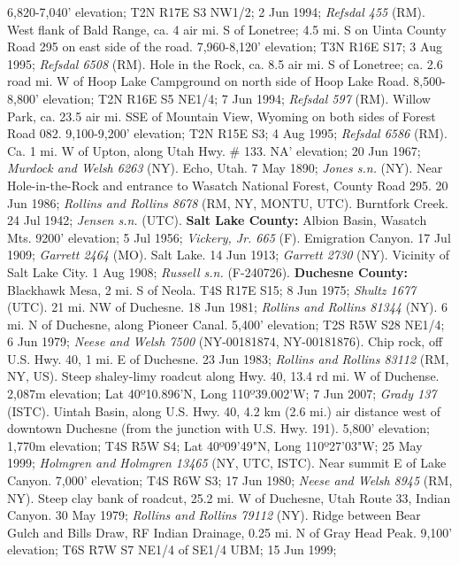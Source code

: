 6,820-7,040' elevation; T2N R17E S3 NW1/2; 2 Jun 1994; \textit{Refsdal 455} (RM).
West flank of Bald Range, ca. 4 air mi. S of Lonetree; 4.5 mi. S on Uinta County
Road 295 on east side of the road. 7,960-8,120' elevation; T3N R16E S17;
3 Aug 1995; \textit{Refsdal 6508} (RM).
Hole in the Rock, ca. 8.5 air mi. S of Lonetree; ca. 2.6 road mi. W of Hoop Lake
Campground on north side of Hoop Lake Road. 8,500-8,800' elevation;
T2N R16E S5 NE1/4; 7 Jun 1994; \textit{Refsdal 597} (RM).
Willow Park, ca. 23.5 air mi. SSE of Mountain View, Wyoming on both sides of
Forest Road 082. 9,100-9,200' elevation; T2N R15E S3; 4 Aug 1995;
\textit{Refsdal 6586} (RM).
Ca. 1 mi. W of Upton, along Utah Hwy. \# 133. NA' elevation; 20 Jun 1967;
\textit{Murdock and Welsh 6263} (NY).
Echo, Utah. 7 May 1890; \textit{Jones s.n.} (NY).
Near Hole-in-the-Rock and entrance to Wasatch National Forest, County Road 295.
20 Jun 1986; \textit{Rollins and Rollins 8678} (RM, NY, MONTU, UTC).
Burntfork Creek. 24 Jul 1942; \textit{Jensen s.n.} (UTC).
  \textbf{Salt Lake County:}
Albion Basin, Wasatch Mts. 9200' elevation; 5 Jul 1956;
\textit{Vickery, Jr. 665} (F).
Emigration Canyon. 17 Jul 1909; \textit{Garrett 2464} (MO).
Salt Lake. 14 Jun 1913; \textit{Garrett 2730} (NY).
Vicinity of Salt Lake City. 1 Aug 1908; \textit{Russell s.n.} (F-240726).
  \textbf{Duchesne County:}
Blackhawk Mesa, 2 mi. S of Neola. T4S R17E S15; 8 Jun 1975;
\textit{Shultz 1677} (UTC).
21 mi. NW of Duchesne. 18 Jun 1981; \textit{Rollins and Rollins 81344} (NY).
6 mi. N of Duchesne, along Pioneer Canal. 5,400' elevation; T2S R5W S28 NE1/4;
6 Jun 1979; \textit{Neese and Welsh 7500} (NY-00181874, NY-00181876).
Chip rock, off U.S. Hwy. 40, 1 mi. E of Duchesne. 23 Jun 1983;
\textit{Rollins and Rollins 83112} (RM, NY, US).
Steep shaley-limy roadcut along Hwy. 40, 13.4 rd mi. W of Duchense.
2,087m elevation; Lat 40º10.896'N, Long 110º39.002'W; 7 Jun 2007;
\textit{Grady 137} (ISTC).
Uintah Basin, along U.S. Hwy. 40, 4.2 km (2.6 mi.) air distance west of downtown
Duchesne (from the junction with U.S. Hwy. 191). 5,800' elevation;
1,770m elevation; T4S R5W S4; Lat 40º09'49"N, Long 110º27'03"W; 25 May 1999;
\textit{Holmgren and Holmgren 13465} (NY, UTC, ISTC).
Near summit E of Lake Canyon. 7,000' elevation; T4S R6W S3; 17 Jun 1980;
\textit{Neese and Welsh 8945} (RM, NY).
Steep clay bank of roadcut, 25.2 mi. W of Duchesne, Utah Route 33, Indian Canyon.
30 May 1979; \textit{Rollins and Rollins 79112} (NY).
Ridge between Bear Gulch and Bills Draw, RF Indian Drainage, 0.25 mi. N of
Gray Head Peak. 9,100' elevation; T6S R7W S7 NE1/4 of SE1/4 UBM; 15 Jun 1999;
